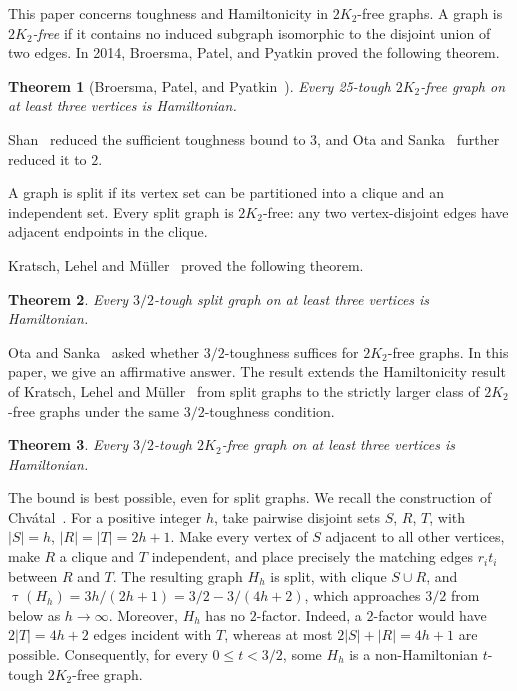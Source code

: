 \documentclass[11pt]{article}
\numberwithin{equation}{section}
\newtheorem{theorem}{Theorem}[section]
\theoremstyle{plain}
\theoremstyle{definition}
\theoremstyle{plain}
\begin{document}
This paper concerns toughness and Hamiltonicity in $2K_2$-free
graphs. A graph is \emph{$2K_2$-free} if it contains no induced
subgraph isomorphic to the disjoint union of two edges.
In 2014, Broersma, Patel, and Pyatkin proved the following theorem.

\begin{theorem}[Broersma, Patel, and Pyatkin~\cite{BroersmaPatelPyatkin2014}]\label{thm:25-tough}
    Every 25-tough $2K_2$-free graph on at least three vertices is Hamiltonian.
\end{theorem}

Shan~\cite{Shan2020} reduced the sufficient
toughness bound to $3$, and Ota and Sanka~\cite{OtaSanka2022}
further reduced it to $2$.

A graph is split if its vertex set can be partitioned into a clique
and an independent set. Every split graph is $2K_2$-free: any two
vertex-disjoint edges have adjacent endpoints in the clique.

Kratsch, Lehel and M\"uller~\cite{KratschLehelMuller1996} proved the following theorem.

\begin{theorem}\label{thm:KratschLehelMuller1996}
    Every $3/2$-tough split graph on at least three vertices is
Hamiltonian.
\end{theorem}


Ota and Sanka~\cite{OtaSanka2022} asked whether $3/2$-toughness   
suffices for $2K_2$-free graphs.
In this paper, we give an affirmative
answer. 
The result extends the Hamiltonicity result of
Kratsch, Lehel and M\"uller~\cite{KratschLehelMuller1996} from
split graphs to the strictly larger class of $2K_2$-free graphs
under the same $3/2$-toughness condition.

\begin{theorem}\label{thm:main}
Every $3/2$-tough $2K_2$-free graph on at least three vertices
is Hamiltonian.
\end{theorem}

The bound is best possible, even for split graphs.
We recall the construction of
Chv\'atal~\cite{Chvatal1973}.
For a positive integer $h$, take pairwise disjoint sets
$S$, $R$,
$T$, with $|S|=h$, $|R|=|T|=2h+1$.
Make every vertex of $S$ adjacent to all other vertices, make $R$
a clique and $T$ independent, and place precisely the matching
edges $r_it_i$ between $R$ and $T$.
The resulting graph $H_h$ is split, with clique $S\cup R$, and
$\uptau(H_h)=3h/(2h+1)=3/2-3/(4h+2)$, which approaches $3/2$
from below as $h\to\infty$.
Moreover, $H_h$ has no $2$-factor. Indeed, a $2$-factor would have $2|T|=4h+2$ edges
incident with $T$, whereas at most $2|S|+|R|=4h+1$ are possible.
Consequently, for every $0\leq t<3/2$, some $H_h$ is a non-Hamiltonian
$t$-tough $2K_2$-free graph.
\end{document}
